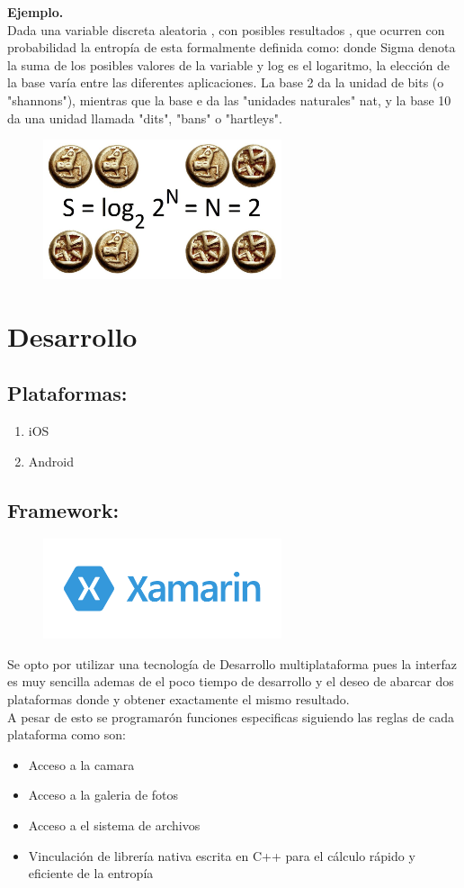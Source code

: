 \documentclass[conference]{IEEEtran}
\begin{document}
\textbf{Ejemplo.}\\
Dada una variable discreta aleatoria 
, con posibles resultados 
, que ocurren con probabilidad 
la entropía de 
esta formalmente definida como: 
donde Sigma denota la suma de los posibles valores de la variable y log es el logaritmo, la elección de la base varía entre las diferentes aplicaciones. La base 2 da la unidad de bits (o "shannons"), mientras que la base e da las "unidades naturales" nat, y la base 10 da una unidad llamada "dits", "bans" o "hartleys". 
\begin{figure}[h!]
    \centering
    \includegraphics[width=7cm]{flip_coins.jpg}
\end{figure}


\section{Desarrollo}
\subsection{Plataformas:}
\begin{enumerate}
    \item iOS
    \item Android
\end{enumerate}
\subsection{Framework:}


\begin{figure}[h!]
    \centering
    \includegraphics[width=7cm]{logox.png}
\end{figure}
Se opto por utilizar una tecnología de Desarrollo multiplataforma pues la interfaz es muy sencilla ademas de el poco tiempo de desarrollo y el deseo de abarcar dos plataformas donde y obtener exactamente el mismo resultado.\\
A pesar de esto se programarón funciones especificas siguiendo las reglas de cada plataforma como son:
\begin{itemize}
    \item Acceso a la camara
    \item Acceso a la galeria de fotos
    \item Acceso a el sistema de archivos
    \item Vinculación de librería nativa escrita en C++ para el cálculo rápido y eficiente de la entropía
\end{itemize}
\end{document}
